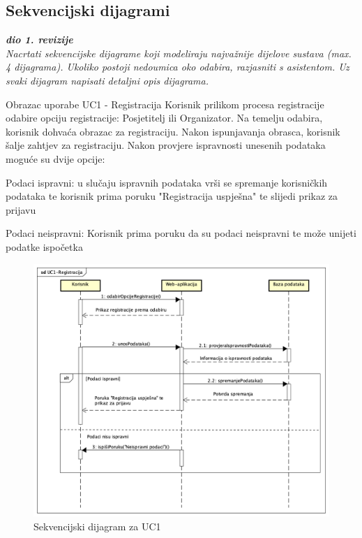 			\subsection{Sekvencijski dijagrami}
				
				\textbf{\textit{dio 1. revizije}}\\
				
				\textit{Nacrtati sekvencijske dijagrame koji modeliraju najvažnije dijelove sustava (max. 4 dijagrama). Ukoliko postoji nedoumica oko odabira, razjasniti s asistentom. Uz svaki dijagram napisati detaljni opis dijagrama.}
				\eject
	
				\LARGE {Obrazac uporabe UC1 - Registracija}
				\newline
				\normalsize
				Korisnik prilikom procesa registracije odabire opciju registracije: Posjetitelj ili Organizator. Na temelju odabira, korisnik dohvaća obrazac za registraciju. Nakon ispunjavanja obrasca, korisnik šalje zahtjev za registraciju. Nakon provjere ispravnosti unesenih podataka moguće su dvije opcije:
				
				\begin{packed_item}
					\item {Podaci ispravni:} u slučaju ispravnih podataka vrši se spremanje korisničkih podataka te korisnik prima poruku "Registracija uspješna" te slijedi prikaz za prijavu
					\item {Podaci neispravni:} Korisnik prima poruku da su podaci neispravni te može unijeti podatke ispočetka
				\end{packed_item}
				
				\begin{figure}[H]
					\includegraphics[scale=0.5]{dijagrami/sd-UC1-Registracija.png} %
					\centering
					\caption{Sekvencijski dijagram za UC1}
					\label{fig:promjene}
				\end{figure}
				\eject		
				
